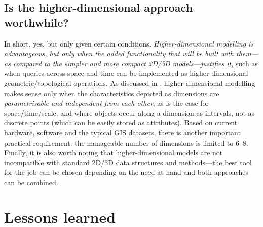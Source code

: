 
\subsection*{Is the higher-dimensional approach worthwhile?}

In short, yes, but only given certain conditions.
\emph{Higher-dimensional modelling is advantageous, but only when the added functionality that will be built with them---as compared to the simpler and more compact 2D/3D models---justifies it}, such as when queries across space and time can be implemented as higher-dimensional geometric/topological operations.
As discussed in , higher-dimensional modelling makes sense only when the characteristics depicted as dimensions are \emph{parametrisable and independent from each other}, as is the case for space/time/scale, and where objects occur along a dimension as intervals, not as discrete points (which can be easily stored as attributes).
Based on current hardware, software and the typical GIS datasets, there is another important practical requirement: the manageable number of dimensions is limited to 6--8.
Finally, it is also worth noting that higher-dimensional models are not incompatible with standard 2D/3D data structures and methods---the best tool for the job can be chosen depending on the need at hand and both approaches can be combined.

\section{Lessons learned}
\label{se:conclusions}

